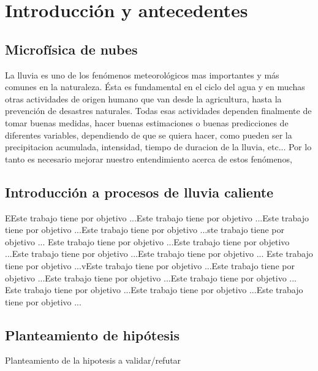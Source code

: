 \chapter{Introducción y antecedentes}
\section{Microfísica de nubes} 
La lluvia es uno de los fenómenos meteorológicos mas importantes y más comunes en la naturaleza. Ésta es fundamental en el ciclo del agua y en muchas otras actividades de origen humano que van desde la agricultura, hasta la prevención de desastres naturales. 
Todas esas actividades dependen finalmente de tomar buenas medidas, hacer buenas estimaciones o  buenas predicciones de diferentes variables, dependiendo de que se quiera hacer, como pueden ser la precipitacion acumulada, intensidad, tiempo de duracion de la lluvia, etc...
Por lo tanto es necesario mejorar nuestro entendimiento acerca de estos fenómenos,


\section{Introducción a procesos de lluvia caliente}
EEste trabajo tiene por objetivo ...Este trabajo tiene por objetivo ...Este trabajo tiene por objetivo ...Este trabajo tiene por objetivo ...ste trabajo tiene por objetivo ...
Este trabajo tiene por objetivo ...Este trabajo tiene por objetivo ...Este trabajo tiene por objetivo ...Este trabajo tiene por objetivo ...
Este trabajo tiene por objetivo ...vEste trabajo tiene por objetivo ...Este trabajo tiene por objetivo ...Este trabajo tiene por objetivo ...Este trabajo tiene por objetivo ...
Este trabajo tiene por objetivo ...Este trabajo tiene por objetivo ...Este trabajo tiene por objetivo ...
\section{Planteamiento de hipótesis}
Planteamiento de la hipotesis a validar/refutar